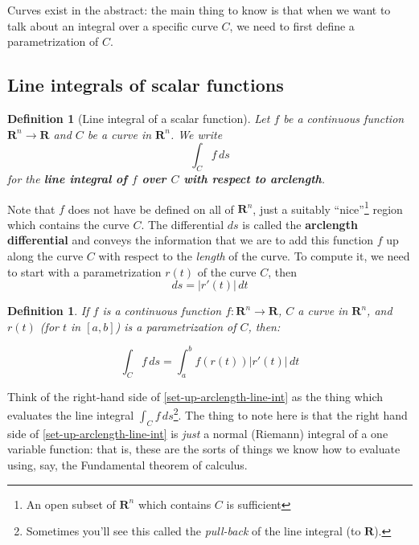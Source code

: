 \documentclass[12pt]{article}
\numberwithin{equation}{subsection}
\numberwithin{figure}{subsection}
\newtheorem{defn}[subsection]{Definition}
\theoremstyle{note}
\newcommand{\R}{\mathbf{R}}
\begin{document}
{Curves exist in the abstract: the main thing to know is that when we want to talk about an integral over a specific curve $C$, we need to first define a parametrization of $C$. 


\subsection{Line integrals of scalar functions} 

\begin{defn}[Line integral of a scalar function] Let $f$ be a continuous function $\mathbf{R}^n\to\mathbf{R}$ and $C$ be a curve in $\mathbf{R}^n$. We write  \begin{equation}  \int_C f \,ds\end{equation} for the \textbf{line integral of $f$ over $C$ with respect to arclength}. 
\end{defn} 
Note that $f$ does not have be defined on all of $\mathbf{R}^n$, just a suitably ``nice''\footnote{An open subset of $\R^n$ which contains $C$ is sufficient} region which contains the curve $C$. The differential $ds$ is called the \textbf{arclength differential} and conveys the information that we are to add this function $f$ up along the curve $C$ with respect to the \textit{length} of the curve. To compute it, we need to start with a parametrization $r(t)$ of the curve $C$, then \begin{equation} ds=|r'(t)|\,dt \end{equation}

\begin{defn} If $f$ is a continuous function $f\colon \mathbf{R}^n\to \mathbf{R}$, $C$ a curve in $\mathbf{R}^n$, and  $r(t)$ (for $t$ in $[a,b]$) is a parametrization of $C$, then: 

\begin{equation} \label{set-up-arclength-line-int}\int_C f \,ds = \int_a^b f\left( r(t) \right) |r'(t)|\,dt\end{equation}
\end{defn} 
Think of the right-hand side of \eqref{set-up-arclength-line-int} as the thing which evaluates the line integral $\int_C f\,ds$\footnote{Sometimes you'll see this called the \textit{pull-back} of the line integral (to $\mathbf{R}$).}. The thing to note here is that the right hand side of \eqref{set-up-arclength-line-int} is \textit{just} a normal (Riemann) integral of a one variable function: that is, these are the sorts of things we know how to evaluate using, say, the Fundamental theorem of calculus. 

}
\end{document}
